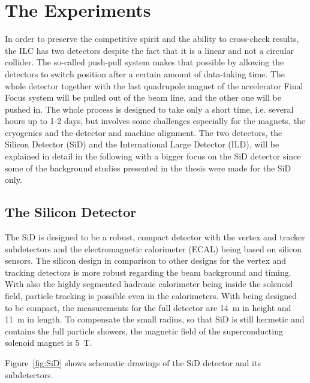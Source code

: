 \section{The Experiments}
\label{ILC:detectors}

In order to preserve the competitive spirit and the ability to cross-check results, the ILC has two detectors despite the fact that it is a linear and not a circular collider.
The so-called push-pull system makes that possible by allowing the detectors to switch position after a certain amount of data-taking time.
The whole detector together with the last quadrupole magnet of the accelerator Final Focus system will be pulled out of the beam line, and the other one will be pushed in.
The whole process is designed to take only a short time, i.e. several hours up to 1-2 days, but involves some challenges especially for the magnets, the cryogenics and the detector and machine alignment.\cite[p. 28-29]{TDR1}
The two detectors, the Silicon Detector (SiD) and the International Large Detector (ILD), will be explained in detail in the following with a bigger focus on the SiD detector since some of the background studies presented in the thesis were made for the SiD only.

\subsection{The Silicon Detector}
The SiD is designed to be a robust, compact detector with the vertex and tracker subdetectors and the electromagnetic calorimeter (ECAL) being based on silicon sensors.
The silicon design in comparison to other designs for the vertex and tracking detectors is more robust regarding the beam background and timing.
With also the highly segmented hadronic calorimeter being inside the solenoid field, particle tracking is possible even in the calorimeters.
With being designed to be compact, the measurements for the full detector are \SI{14}{m} in height and \SI{11}{m} in length.
To compensate the small radius, so that SiD is still hermetic and contains the full particle showers, the magnetic field of the superconducting solenoid magnet is \SI{5}{T}.

Figure~\ref{fig:SiD} shows schematic drawings of the SiD detector and its subdetectors.

